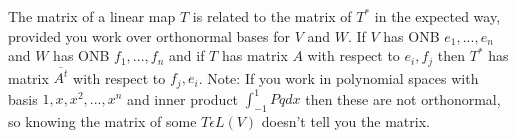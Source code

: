 \documentclass{article}
\begin{document}
The matrix of a linear map $T$ is related to the matrix of $T^*$ in the expected way, provided you work over orthonormal bases for $V$ and $W$. If $V$ has ONB $e_1, ..., e_n$ and $W$ has ONB $f_1, ..., f_n$ and if $T$ has matrix $A$ with respect to $e_i, f_j$ then $T^*$ has matrix $\overline{A^t}$ with respect to $f_j, e_i$. Note: If you work in polynomial spaces with basis $1, x, x^2, ..., x^n$ and inner product $\int_{-1}^{1} Pq dx$ then these are not orthonormal, so knowing the matrix of some $T \epsilon L(V)$ doesn't tell you the matrix. 
\end{document}
